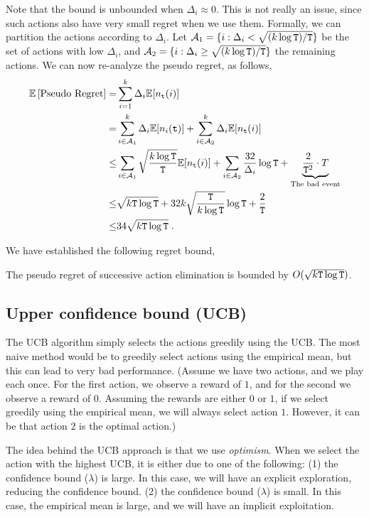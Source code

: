 Note that the bound is unbounded when $\Delta_i\approx 0$. This is not really an issue, since such actions also have very small regret when we use them. Formally, we can partition the actions according to $\Delta_i$. Let $\mathcal{A}_1=\{i:\Delta_i< \sqrt{(k\log{\tt T})/{\tt T}}\}$ be the set of actions with low $\Delta_i$, and $\mathcal{A}_2=\{i:\Delta_i\geq \sqrt{(k\log{\tt T})/{\tt T}}\}$ the remaining actions. We can now re-analyze the pseudo regret, as follows,
\begin{align*}
\mathbb{E}\left[\text{Pseudo Regret}\right]  = &  \sum_{i=1}^{k}\Delta_{i}\mathbb{E}[n_{{\tt t}}(i)]\\
= &  \sum_{i\in \mathcal{A}_1}^{k}\Delta_{i}\mathbb{E}[n_{i}({\tt t})]+ \sum_{i\in \mathcal{A}_2}^{k}\Delta_{i}\mathbb{E}[n_{{\tt t}}(i)]\\
  \le & \sum_{i\in\mathcal{A}_1}\sqrt{\frac{k\log{\tt T}}{{\tt T}}}\mathbb{E}[n_{{\tt t}}(i)] +\sum_{i\in\mathcal{A}_2}\frac{32}{\Delta_{i}}\log {\tt T}
  +\underbrace{\frac{2}{{\tt T}^{2}}\cdot T}_{\text{The bad event}}\\
  \leq & \sqrt{k{\tt T}\log{\tt T}}+ 32 k \sqrt{\frac{{\tt T}}{k\log {\tt T}}}\log{\tt T}+ \frac{2}{{\tt T}}\\
  \leq & 34  \sqrt{k{\tt T}\log{\tt T}}\;.
\end{align*}

We have established the following regret bound,
\begin{theorem}
\label{thm:MAB:SE2}
The pseudo regret of successive action elimination is bounded by $O( \sqrt{k{\tt T}\log{\tt T}})$.
\end{theorem}


\subsection{Upper confidence bound (UCB)}

The UCB algorithm simply selects the actions greedily using the UCB. The most naive method would be to greedily select actions using the empirical mean, but this can lead to very bad performance. (Assume we have two actions, and we play each once. For the first action, we observe a reward of $1$, and for the second we observe a reward of $0$. Assuming the rewards are either  $0$ or $1$, if we select greedily using the empirical mean, we will always select action $1$. However, it can be that action $2$ is the optimal action.)


The idea behind the UCB approach is that we use \emph{optimism}. When we select the action with the highest UCB, it is either due to one of the following: (1) the confidence bound ($\lambda$) is large. In this case, we will have an explicit exploration, reducing the confidence bound. (2) the confidence bound ($\lambda$) is small. In this case, the empirical mean is large, and we will have an implicit exploitation.

